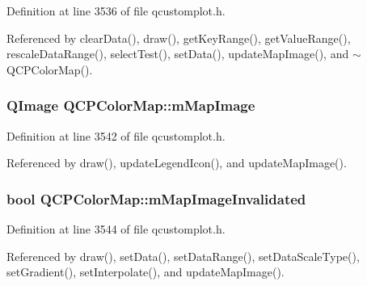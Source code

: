Definition at line 3536 of file qcustomplot.\+h.



Referenced by clear\+Data(), draw(), get\+Key\+Range(), get\+Value\+Range(), rescale\+Data\+Range(), select\+Test(), set\+Data(), update\+Map\+Image(), and $\sim$\+Q\+C\+P\+Color\+Map().

\hypertarget{class_q_c_p_color_map_a66110813b42eca78b64095b2a1f285a0}{}
\subsubsection[{m\+Map\+Image}]{\setlength{\rightskip}{0pt plus 5cm}Q\+Image Q\+C\+P\+Color\+Map\+::m\+Map\+Image\hspace{0.3cm}{\ttfamily [protected]}}\label{class_q_c_p_color_map_a66110813b42eca78b64095b2a1f285a0}


Definition at line 3542 of file qcustomplot.\+h.



Referenced by draw(), update\+Legend\+Icon(), and update\+Map\+Image().

\hypertarget{class_q_c_p_color_map_ac9aea6a5c193d7fa866bc7b26e79ef2c}{}
\subsubsection[{m\+Map\+Image\+Invalidated}]{\setlength{\rightskip}{0pt plus 5cm}bool Q\+C\+P\+Color\+Map\+::m\+Map\+Image\+Invalidated\hspace{0.3cm}{\ttfamily [protected]}}\label{class_q_c_p_color_map_ac9aea6a5c193d7fa866bc7b26e79ef2c}


Definition at line 3544 of file qcustomplot.\+h.



Referenced by draw(), set\+Data(), set\+Data\+Range(), set\+Data\+Scale\+Type(), set\+Gradient(), set\+Interpolate(), and update\+Map\+Image().

\hypertarget{class_q_c_p_color_map_ac2e9425fe4381b496726e1c09f978302}{}
